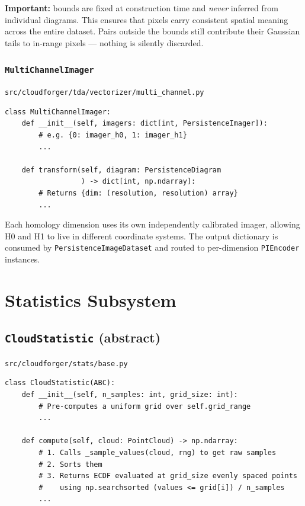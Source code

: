 \documentclass[11pt, a4paper]{article}
\newcommand{\code}[1]{\texttt{#1}}
\newcommand{\pyfile}[1]{\texttt{\small #1}}
\newcommand{\typename}[1]{\textbf{\texttt{#1}}}
\begin{document}
\textbf{Important:} bounds are fixed at construction time and \emph{never}
inferred from individual diagrams.
This ensures that pixels carry consistent spatial meaning across the
entire dataset.
Pairs outside the bounds still contribute their Gaussian tails to
in-range pixels --- nothing is silently discarded.

\subsubsection{\typename{MultiChannelImager}}
\pyfile{src/cloudforger/tda/vectorizer/multi\_channel.py}

\begin{lstlisting}
class MultiChannelImager:
    def __init__(self, imagers: dict[int, PersistenceImager]):
        # e.g. {0: imager_h0, 1: imager_h1}
        ...

    def transform(self, diagram: PersistenceDiagram
                  ) -> dict[int, np.ndarray]:
        # Returns {dim: (resolution, resolution) array}
        ...
\end{lstlisting}

Each homology dimension uses its own independently calibrated imager,
allowing H0 and H1 to live in different coordinate systems.
The output dictionary is consumed by \code{PersistenceImageDataset}
and routed to per-dimension \code{PIEncoder} instances.

\section{Statistics Subsystem}
\label{sec:stats}

\subsection{\typename{CloudStatistic} (abstract)}
\pyfile{src/cloudforger/stats/base.py}

\begin{lstlisting}
class CloudStatistic(ABC):
    def __init__(self, n_samples: int, grid_size: int):
        # Pre-computes a uniform grid over self.grid_range
        ...

    def compute(self, cloud: PointCloud) -> np.ndarray:
        # 1. Calls _sample_values(cloud, rng) to get raw samples
        # 2. Sorts them
        # 3. Returns ECDF evaluated at grid_size evenly spaced points
        #    using np.searchsorted (values <= grid[i]) / n_samples
        ...
\end{lstlisting}
\end{document}
